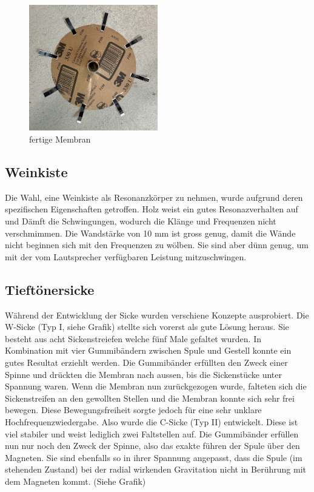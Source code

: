 \documentclass[a4paper,11pt]{report}
\begin{document}
\begin{figure}[h]
    \centering
    \includegraphics[width=0.5\textwidth]{resources/images/Fotos/Physik-87.jpg}
    \caption{{fertige Membran}}
    \label{fig:membrane_fin}
\end{figure}
\newpage
\subsection{Weinkiste}
Die Wahl, eine Weinkiste als Resonanzkörper zu nehmen, wurde aufgrund deren spezifischen Eigenschaften getroffen. Holz weist ein gutes Resonazverhalten auf und Dämft die Schwingungen, wodurch die Klänge und Frequenzen nicht verschmimmen. Die Wandstärke von 10 mm ist gross genug, damit die Wände nicht beginnen sich mit den Frequenzen zu wölben. Sie sind aber dünn genug, um mit der vom Lautsprecher verfügbaren Leistung mitzuschwingen. 

\subsection{Tieftönersicke}
Während der Entwicklung der Sicke wurden verschiene Konzepte ausprobiert. Die W-Sicke (Typ I, siehe Grafik) stellte sich vorerst als gute Lösung heraus. Sie besteht aus acht Sickenstreiefen welche fünf Male gefaltet wurden. In Kombination mit vier Gummibändern zwischen Spule und Gestell konnte ein gutes Resultat erziehlt werden. Die Gummibänder erfüllten den Zweck einer Spinne und drückten die Membran nach aussen, bis die Sickenstücke unter Spannung waren. Wenn die Membran nun zurückgezogen wurde, falteten sich die Sickenstreifen an den gewollten Stellen und die Membran konnte sich sehr frei bewegen. Diese Bewegungsfreiheit sorgte jedoch für eine sehr unklare Hochfrequenzwiedergabe. Also wurde die C-Sicke (Typ II) entwickelt. Diese ist viel stabiler und weist lediglich zwei Faltstellen auf. Die Gummibänder erfüllen nun nur noch den Zweck der Spinne, also das exakte führen der Spule über den Magneten. Sie sind ebenfalls so in ihrer Spannung angepasst, dass die Spule (im stehenden Zustand) bei der radial wirkenden Gravitation nicht in Berührung mit dem Magneten kommt. (Siehe Grafik) 
\end{document}
